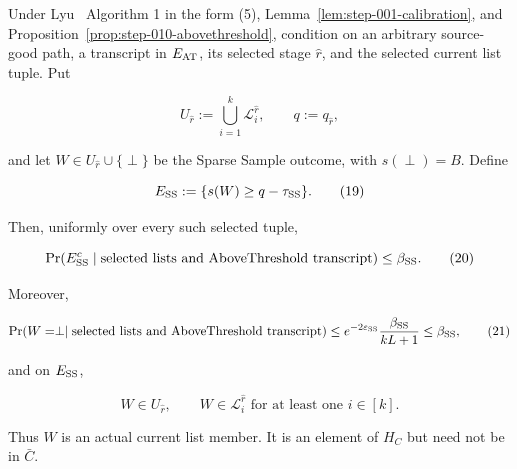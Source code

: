 \begin{lemma}\label{lem:step-010-sparse-output}
Under Lyu~\citep{lyu2025} Algorithm 1 in the form (5), Lemma~\ref{lem:step-001-calibration}, and
Proposition~\ref{prop:step-010-abovethreshold}, condition on an arbitrary
source-good path, a transcript in \(E_{\rm AT}\), its selected stage
\(\widehat r\), and the selected current list tuple. Put

\[
 U_{\widehat r}:=\bigcup_{i=1}^k\mathcal L_i^{\widehat r},
 \qquad q:=q_{\widehat r},
\]

and let \(W\in U_{\widehat r}\cup\{\perp\}\) be the Sparse Sample outcome,
with \(s(\perp)=B\). Define

\[
 E_{\rm SS}:=\{s(W)\geq q-\tau_{\rm SS}\}.
 \tag{19}
\]

Then, uniformly over every such selected tuple,

\[
 \Pr(E_{\rm SS}^c\mid
       \text{selected lists and AboveThreshold transcript})
 \leq\beta_{\rm SS}.
 \tag{20}
\]

Moreover,

\[
 \Pr(W=\perp\mid
       \text{selected lists and AboveThreshold transcript})
 \leq
 e^{-2\varepsilon_{\rm SS}}
 \frac{\beta_{\rm SS}}{kL+1}
 \leq\beta_{\rm SS},
 \tag{21}
\]

and on \(E_{\rm SS}\),

\[
 W\in U_{\widehat r},
 \qquad
 W\in\mathcal L_i^{\widehat r}
 \text{ for at least one }i\in[k].
 \tag{22}
\]

Thus \(W\) is an actual current list member. It is an element of \(H_C\)
but need not be in \(\bar C\).


\end{lemma}

